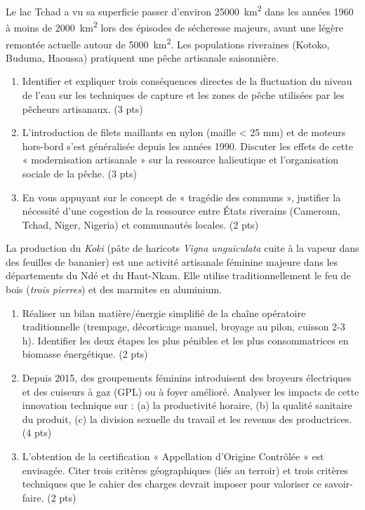 \documentclass[11pt]{article}
\begin{document}
\begin{exercice}
Le lac Tchad a vu sa superficie passer d'environ \SI{25000}{km^2} dans les années 1960 à moins de \SI{2000}{km^2} lors des épisodes de sécheresse majeurs, avant une légère remontée actuelle autour de \SI{5000}{km^2}. Les populations riveraines (Kotoko, Buduma, Haoussa) pratiquent une pêche artisanale saisonnière.

\begin{enumerate}
\item Identifier et expliquer trois conséquences directes de la fluctuation du niveau de l'eau sur les techniques de capture et les zones de pêche utilisées par les pêcheurs artisanaux. \hfill (3 pts)
\item L'introduction de filets maillants en nylon (maille < 25 mm) et de moteurs hors-bord s'est généralisée depuis les années 1990. Discuter les effets de cette « modernisation artisanale » sur la ressource halieutique et l'organisation sociale de la pêche. \hfill (3 pts)
\item En vous appuyant sur le concept de « tragédie des communs », justifier la nécessité d'une cogestion de la ressource entre États riverains (Cameroun, Tchad, Niger, Nigeria) et communautés locales. \hfill (2 pts)
\end{enumerate}
\end{exercice}

\begin{exercice}
La production du \textit{Koki} (pâte de haricots \textit{Vigna unguiculata} cuite à la vapeur dans des feuilles de bananier) est une activité artisanale féminine majeure dans les départements du Ndé et du Haut-Nkam. Elle utilise traditionnellement le feu de bois (\textit{trois pierres}) et des marmites en aluminium.

\begin{enumerate}
\item Réaliser un bilan matière/énergie simplifié de la chaîne opératoire traditionnelle (trempage, décorticage manuel, broyage au pilon, cuisson 2-3 h). Identifier les deux étapes les plus pénibles et les plus consommatrices en biomasse énergétique. \hfill (2 pts)
\item Depuis 2015, des groupements féminins introduisent des broyeurs électriques et des cuiseurs à gaz (GPL) ou à foyer amélioré. Analyser les impacts de cette innovation technique sur : (a) la productivité horaire, (b) la qualité sanitaire du produit, (c) la division sexuelle du travail et les revenus des productrices. \hfill (4 pts)
\item L'obtention de la certification « Appellation d'Origine Contrôlée » est envisagée. Citer trois critères géographiques (liés au terroir) et trois critères techniques que le cahier des charges devrait imposer pour valoriser ce savoir-faire. \hfill (2 pts)
\end{enumerate}
\end{exercice}
\end{document}

